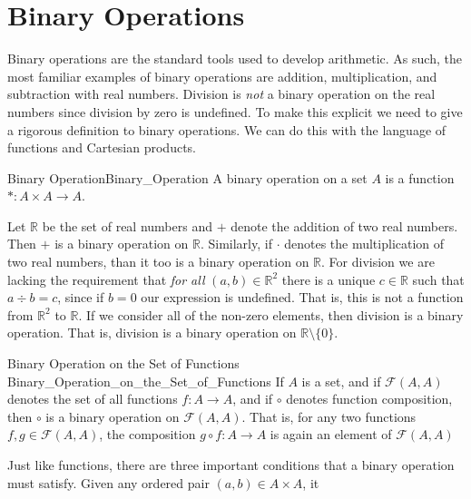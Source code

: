 \section{Binary Operations}
    Binary operations are the standard tools used to develop arithmetic. As
    such, the most familiar examples of binary operations are addition,
    multiplication, and subtraction with real numbers. Division is \textit{not}
    a binary operation on the real numbers since division by zero is undefined.
    To make this explicit we need to give a rigorous definition to binary
    operations. We can do this with the language of functions
    and Cartesian products.
    \begin{fdefinition}{Binary Operation}{Binary_Operation}
        A \gls{binary operation} on a \gls{set} $A$ is a function
        $*:A\times{A}\rightarrow{A}$.
    \end{fdefinition}
    \begin{example}
        Let $\mathbb{R}$ be the set of real numbers and $+$ denote the addition
        of two real numbers. Then $+$ is a binary operation on $\mathbb{R}$.
        Similarly, if $\cdot$ denotes the multiplication of two real numbers,
        than it too is a binary operation on $\mathbb{R}$. For division we are
        lacking the requirement that \textit{for all} $(a,b)\in\mathbb{R}^{2}$
        there is a unique $c\in\mathbb{R}$ such that $a\div{b}=c$, since if
        $b=0$ our expression is undefined. That is, this is not a function from
        $\mathbb{R}^{2}$ to $\mathbb{R}$. If we consider
        all of the non-zero elements, then division is a binary operation. That
        is, division is a binary operation on $\mathbb{R}\setminus\{0\}$.
    \end{example}
    \begin{lexample}{Binary Operation on the Set of Functions}
                    {Binary_Operation_on_the_Set_of_Functions}
        If $A$ is a set, and if $\mathcal{F}(A,A)$ denotes the set of all
        functions $f:A\rightarrow{A}$, and if $\circ$ denotes function
        composition, then $\circ$ is a binary operation on $\mathcal{F}(A,A)$.
        That is, for any two functions $f,g\in\mathcal{F}(A,A)$, the composition
        $g\circ{f}:A\rightarrow{A}$ is again an element of $\mathcal{F}(A,A)$
    \end{lexample}
    Just like functions, there are three important conditions that a binary
    operation must satisfy. Given any ordered pair $(a,b)\in{A}\times{A}$, it

